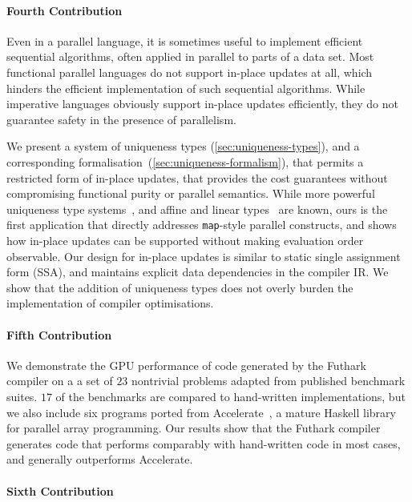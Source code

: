 \paragraph{Fourth Contribution}

Even in a parallel language, it is sometimes useful to implement
efficient sequential algorithms, often applied in parallel to parts of
a data set.  Most functional parallel languages do not support
in-place updates at all, which hinders the efficient implementation of
such sequential algorithms.  While imperative languages obviously
support in-place updates efficiently, they do not guarantee safety in
the presence of parallelism.

We present a system of uniqueness types (\cref{sec:uniqueness-types}),
and a corresponding formalisation~(\cref{sec:uniqueness-formalism}),
that permits a restricted form of in-place updates, that provides the
cost guarantees without compromising functional purity or parallel
semantics.  While more powerful uniqueness type
systems~\cite{clean-uniqueness-types}, and affine and linear
types~\cite{Tov:2011:PAT:1926385.1926436,Fahndrich:2002:AFP:543552.512532}
are known, ours is the first application that directly addresses
\texttt{map}-style parallel constructs, and shows how in-place updates
can be supported without making evaluation order observable.  Our
design for in-place updates is similar to static single assignment
form (SSA), and maintains explicit data dependencies in the compiler
IR.  We show that the addition of uniqueness types does not overly
burden the implementation of compiler optimisations.

\paragraph{Fifth Contribution}

We demonstrate the GPU performance of code generated by the Futhark
compiler on a a set of $23$ nontrivial problems adapted from published
benchmark suites.  $17$ of the benchmarks are compared to hand-written
implementations, but we also include six programs ported from
Accelerate~\cite{mcdonell2013optimising}, a mature Haskell library for
parallel array programming.  Our results show that the Futhark
compiler generates code that performs comparably with hand-written
code in most cases, and generally outperforms Accelerate.

\paragraph{Sixth Contribution}

